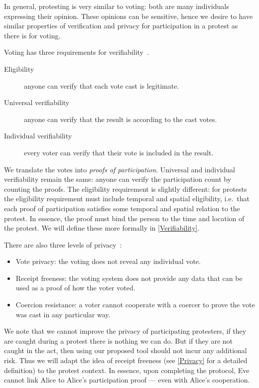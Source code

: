 In general, protesting is very similar to voting: both are many individuals 
expressing their opinion.
These opinions can be sensitive, hence we desire to have similar properties of 
verification and privacy for participation in a protest as there is for voting.

Voting has three requirements for 
verifiability~\cite{VerifyingPrivacyPropertiesOfVotingProtocols}.
\begin{description}
  \item[Eligibility] anyone can verify that each vote cast is legitimate.
  \item[Universal verifiability] anyone can verify that the result is according 
    to the cast votes.
  \item[Individual verifiability] every voter can verify that their vote is 
    included in the result.
\end{description}
We translate the votes into \emph{proofs of participation}.
Universal and individual verifiability remain the same: anyone can verify the 
participation count by counting the proofs.
The eligibility requirement is slightly different:
for protests the eligibility requirement must include temporal and spatial 
eligibility, i.e.\ that each proof of participation satisfies some temporal and 
spatial relation to the protest.
In essence, the proof must bind the person to the time and location of the 
protest.
We will define these more formally in \cref{Verifiability}.

There are also three levels of 
privacy~\cite{VerifyingPrivacyPropertiesOfVotingProtocols}:
\begin{itemize}
  \item\label{VotePrivacy} Vote privacy: the voting does not reveal any 
    individual vote.
  \item\label{ReceiptFreeness} Receipt freeness: the voting system does not 
    provide any data that can be used as a proof of how the voter voted.
  \item\label{CoercionResistance} Coercion resistance: a voter cannot cooperate 
    with a coercer to prove the vote was cast in any particular way.
\end{itemize}
We note that we cannot improve the privacy of participating protesters, if they 
are caught during a protest there is nothing we can do.
But if they are not caught in the act, then using our proposed tool should not 
incur any additional risk.
Thus we will adapt the idea of receipt freeness (see \cref{Privacy} for a 
detailed definition) to the protest context.
In essence, upon completing the protocol, Eve cannot link Alice to Alice's 
participation proof --- even with Alice's cooperation.

